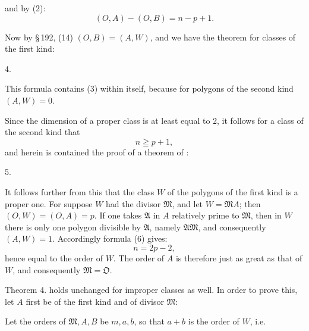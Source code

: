 and by (2):
\[
(O, A) - (O, B) = n - p + 1.
\]

Now by \S\,192, (14) $(O, B) = (A, W)$, and we have
the  theorem for classes of the first kind:

4. 

This formula contains (3) within itself, because for polygons of the
second kind $(A, W) = 0$.

Since the dimension of a proper class is at least equal
to 2, it follows for a class of the second kind that
\[
n \geqq p + 1,
\]
and herein is contained the proof of a theorem of :

5. 

It follows further from this that the class $W$ of the polygons
of the first kind is a proper one. For suppose $W$ had
the divisor $\mathfrak{M}$, and let $W = \mathfrak{M} A$; then $(O, W) = (O, A) = p$.
If one takes $\mathfrak{A}$ in $A$ relatively prime to $\mathfrak{M}$, then in $W$ there is only
one polygon divisible by $\mathfrak{A}$, namely $\mathfrak{A}\mathfrak{M}$, and consequently
$(A, W) = 1$. Accordingly formula (6) gives:
\[
n = 2p - 2,
\]
hence equal to the order of $W$. The order of $A$ is therefore
just as great as that of $W$, and consequently $\mathfrak{M} = \mathfrak{O}$.

Theorem 4. holds unchanged for improper classes as well.
In order to prove this, let $A$ first be of the first kind
and of divisor $\mathfrak{M}$:

Let the orders of $\mathfrak{M}, A, B$ be $m, a, b$, so that $a + b$ is the
order of $W$, i.e.
